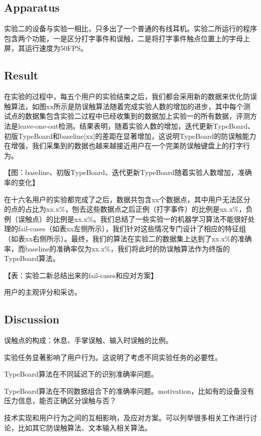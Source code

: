 \subsection{Apparatus}

实验二的设备与实验一相比，只多出了一个普通的有线耳机。实验二所运行的程序包含两个功能，一是区分打字事件和误触，二是将打字事件触点位置上的字母上屏，其运行速度为50FPS。

\subsection{Result}

在实验的过程中，每五个用户的实验结束之后，我们都会采用新的数据来优化防误触算法，如图xx所示是防误触算法随着完成实验人数的增加的进步，其中每个测试点的数据集包含实验二过程中已经收集到的数据加上实验一的所有数据，评测方法是leave-one-out检测。结果表明，随着实验人数的增加，迭代更新TypeBoard、初版TypeBoard和baseline[xx]的差距在显著增加，这说明TypeBoard的防误触能力在增强，我们采集到的数据也越来越接近用户在一个完美防误触键盘上的打字行为。

【图：baseline、初版TypeBoard、迭代更新TypeBoard随着实验人数增加，准确率的变化】

在十六名用户的实验都完成了之后，数据共包含xx个数据点，其中用户无法区分的点的占比为xx.x\%，刨去这些数据点之后正例（打字事件）的比例是xx.x\%，负例（误触点）的比例是xx.x\%。我们总结了一些实验一的机器学习算法不能很好处理的fail-cases（如表xx左侧所示），我们针对这些情况专门设计了相应的特征组（如表xx右侧所示）。最终，我们的算法在实验二的数据集上达到了xx.x\%的准确率，而baseline的准确率仅为xx.x\%，我们将此时的防误触算法作为终版的TypeBoard算法。

【表：实验二新总结出来的fail-cases和应对方案】

用户的主观评分和采访。

\subsection{Discussion}

误触点的构成：休息、手掌误触、输入时误触的比例。

实验任务显著影响了用户行为。这说明了考虑不同实验任务的必要性。

TypeBoard算法在不同延迟下的识别准确率问题。

TypeBoard算法在不同数据组合下的准确率问题。motivation，比如有的设备没有压力信息，能否正确区分误触与否？

技术实现和用户行为之间的互相影响，及应对方案。可以列举很多相关工作进行讨论，比如其它防误触算法、文本输入相关算法。
